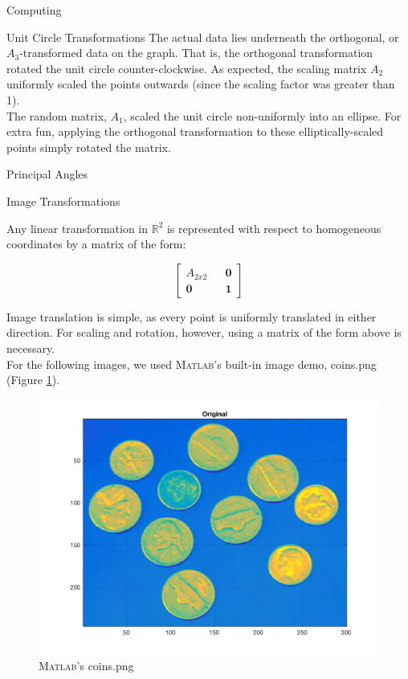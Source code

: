 \begin{section}{Computing}
\begin{homeworkSection}{Unit Circle Transformations}
The actual data lies underneath the orthogonal, or $A_3$-transformed data on the graph. That is, the orthogonal transformation rotated the unit circle counter-clockwise. As expected, the scaling matrix $A_2$ uniformly scaled the points outwards (since the scaling factor was greater than 1). 
\\

The random matrix, $A_1$, scaled the unit circle non-uniformly into an ellipse. For extra fun, applying the orthogonal transformation to these elliptically-scaled points simply rotated the matrix. 


\end{homeworkSection}


\begin{homeworkSection}{Principal Angles}
\end{homeworkSection}


\begin{homeworkSection}{Image Transformations}

Any linear transformation in $\mathbb{R}^2$ is represented with respect to homogeneous coordinates by a matrix of the form:

$$
    \begin{bmatrix}
        A_{2 x 2} && \mathbf{0} \\ \mathbf{0}  && \mathbf{1}
    \end{bmatrix}
$$

Image translation is simple, as every point is uniformly translated in either direction. For scaling and rotation, however, using a matrix of the form above is necessary. \\

For the following images, we used \textsc{Matlab}'s built-in image demo, coins.png (Figure \ref{fig:orig}).

\begin{figure}[H]
\centering
\includegraphics[width=0.75\columnwidth]{../data/orig} %
\caption{\textsc{Matlab}'s coins.png}
\label{fig:orig}
\end{figure}



\end{homeworkSection}
\end{section}
